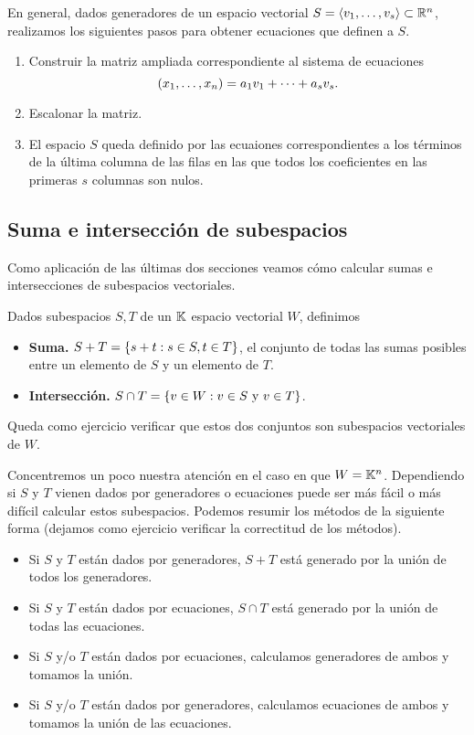 En general, dados generadores de un espacio vectorial $S = \langle \vb_1, \dots, \vb_s \rangle \subset \R^n$, realizamos los siguientes pasos para obtener ecuaciones que definen a $S$.
\begin{enumerate}
\item Construir la matriz ampliada correspondiente al sistema de ecuaciones
$$
(x_1, \dots, x_n) = a_1 \vb_1 + \dots + a_s \vb_s.
$$
\item Escalonar la matriz.
\item El espacio $S$ queda definido por las ecuaiones correspondientes a los términos de la \'ultima columna de las filas en las que todos los coeficientes en las primeras $s$ columnas son nulos.
\end{enumerate}

\subsection{Suma e intersecci\'on de subespacios}

Como aplicación de las últimas dos secciones veamos cómo calcular sumas e intersecciones de subespacios vectoriales.

\tccdefi
\begin{defi}
Dados subespacios $S, T$ de un $\mathbb K$ espacio vectorial $W$, definimos
\begin{itemize}
\item \textbf{Suma.} $S + T = \{ \sbb + \tbb : \sbb \in S, \tbb \in T\}$, el conjunto de todas las sumas posibles entre un elemento de $S$ y un elemento de $T$.
\item \textbf{Intersección.} $S \cap T = \{ \vb \in W: \vb \in S \text{ y } \vb \in T\}$.
\end{itemize}
\end{defi}
\etcc
Queda como ejercicio verificar que estos dos conjuntos son subespacios vectoriales de $W$.

Concentremos un poco nuestra atención en el caso en que $W=\mathbb K^n$. Dependiendo si $S$ y $T$ vienen dados por generadores o ecuaciones puede ser más fácil o más difícil calcular estos subespacios. Podemos resumir los métodos de la siguiente forma (dejamos como ejercicio verificar la correctitud de los métodos).

\begin{itemize}
\item Si $S$ y $T$ est\'an dados por generadores, $S + T$ est\'a generado por la unión de todos los generadores.
\item Si $S$ y $T$ est\'an dados por ecuaciones, $S \cap T$ est\'a generado por la unión de todas las ecuaciones.
\item Si $S$ y/o $T$ est\'an dados por ecuaciones, calculamos generadores de ambos y tomamos la unión.
\item Si $S$ y/o $T$ est\'an dados por generadores, calculamos ecuaciones de ambos y tomamos la unión de las ecuaciones.
\end{itemize}

